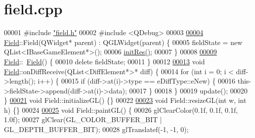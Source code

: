 \hypertarget{a00071_source}{}\section{field.\+cpp}
\label{a00071_source}

\begin{DoxyCode}
00001 \textcolor{preprocessor}{#}\textcolor{preprocessor}{include} \hyperlink{a00074}{"field.h"}
00002 \textcolor{preprocessor}{#}\textcolor{preprocessor}{include} \textcolor{preprocessor}{<}\textcolor{preprocessor}{QDebug}\textcolor{preprocessor}{>}
00003 
\hyperlink{a00173_ab3e028578ffc9df6d7d12dbbc83be19f}{00004} \hyperlink{a00173_a407d6701413d3627ef50e9e86786b987}{Field}::Field(QWidget* parent) : QGLWidget(parent) \{
00005   fieldState = \textcolor{keyword}{new} QList<IBaseGameElement*>();
00006   \hyperlink{a00173_ac2d8f10e9bccfe3cf51cf534c73cecd4}{initRes}\hyperlink{a00173_ac2d8f10e9bccfe3cf51cf534c73cecd4}{(}\hyperlink{a00173_ac2d8f10e9bccfe3cf51cf534c73cecd4}{)};
00007 \}
00008 
\hyperlink{a00173_a45d6e6d09b8f8e46de62b40119d62c60}{00009} \hyperlink{a00173_a407d6701413d3627ef50e9e86786b987}{Field}::~\hyperlink{a00173_a45d6e6d09b8f8e46de62b40119d62c60}{Field}() \{
00010   \textcolor{keyword}{delete} fieldState;
00011 \}
00012 
\hyperlink{a00173_a407d6701413d3627ef50e9e86786b987}{00013} \textcolor{keywordtype}{void} \hyperlink{a00173_a407d6701413d3627ef50e9e86786b987}{Field}::onDiffReceive(QList<DiffElement*>* diff) \{
00014   \textcolor{keywordflow}{for} (\textcolor{keywordtype}{int} i = 0; i < diff->length(); i++) \{
00015     \textcolor{keywordflow}{if} (diff->at(i)->type == eDiffType::eNew) \{
00016       \textcolor{keyword}{this}->fieldState->append(diff->at(i)->data);
00017     \}
00018   \}
00019   update();
00020 \}
\hyperlink{a00173_a38484502a93b5cd191d8ababc415e0cb}{00021} \textcolor{keywordtype}{void} Field::initializeGL() \{\}
00022 
\hyperlink{a00173_a4122f1e70a73ec6c580029d968e4553c}{00023} \textcolor{keywordtype}{void} Field::resizeGL(\textcolor{keywordtype}{int} w, \textcolor{keywordtype}{int} h) \{\}
00024 
\hyperlink{a00173_a43d725e582133d23bcbebdcd7bd4a287}{00025} \textcolor{keywordtype}{void} Field::paintGL() \{
00026   glClearColor(0.1f, 0.1f, 0.1f, 1.0f);
00027   glClear(GL\_COLOR\_BUFFER\_BIT | GL\_DEPTH\_BUFFER\_BIT);
00028   glTranslatef(-1, -1, 0);

\end{DoxyCode}
